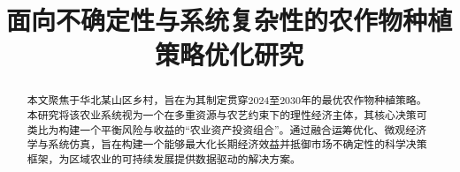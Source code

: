 \documentclass[withoutpreface,bwprint]{cumcmthesis} %
\title{面向不确定性与系统复杂性的农作物种植策略优化研究}
\begin{document}
\maketitle
\begin{abstract}

本文聚焦于华北某山区乡村，旨在为其制定贯穿2024至2030年的最优农作物种植策略。本研究将该农业系统视为一个在多重资源与农艺约束下的理性经济主体，其核心决策可类比为构建一个平衡风险与收益的“农业资产投资组合”。通过融合运筹优化、微观经济学与系统仿真，旨在构建一个能够最大化长期经济效益并抵御市场不确定性的科学决策框架，为区域农业的可持续发展提供数据驱动的解决方案。



\end{abstract}


















\newpage



\newpage
\end{document}
